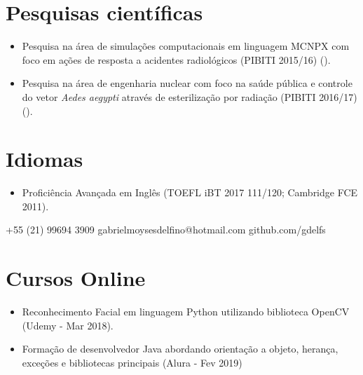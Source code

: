 \documentclass{tccv}
\begin{document}
\section{Pesquisas científicas}

    \begin{itemize}
        \item Pesquisa na área de simulações computacionais em linguagem MCNPX com foco em ações de resposta a acidentes radiológicos (PIBITI 2015/16)  (\href{https://github.com/gdelfs/Simualacoes-Computacionais-em-MCNPX}{\faCode}).
        \item  Pesquisa na área de engenharia nuclear com foco na saúde pública e controle do vetor \textit{Aedes aegypti} através de esterilização por radiação (PIBITI 2016/17) (\href{https://github.com/gdelfs/Esterilizacao-Aedes-Aegypti-com-radiacao}{\faCode}).
    \end{itemize}

\section{Idiomas}

\begin{itemize}
	\item Proficiência Avançada em Inglês (TOEFL iBT 2017 111/120; Cambridge FCE 2011).
\end{itemize}

        
        {+55 (21) 99694 3909} %
        {gabrielmoysesdelfino@hotmail.com} %
        {github.com/gdelfs} %
        
     \newline   
\section{Cursos Online}
      \begin{itemize}  
        \item Reconhecimento Facial em linguagem Python utilizando biblioteca OpenCV (Udemy - Mar 2018).
        \item Formação de desenvolvedor Java abordando orientação a objeto, herança, exceções e bibliotecas principais (Alura - Fev 2019)
    \end{itemize}
\end{document}
